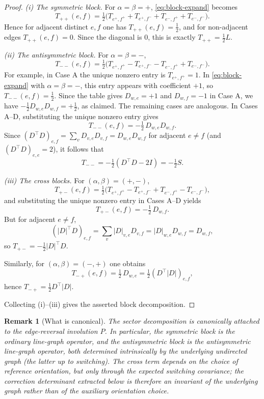 \documentclass[11pt]{article}
\newtheorem{remark}{Remark}
\begin{document}
\begin{proof}
\smallskip
\noindent\emph{(i) The symmetric block.}
For $\alpha=\beta=+$, \eqref{eq:block-expand} becomes
\[
T_{++}(e,f)=\tfrac12\bigl(T_{e^+,f^+}+T_{e^+,f^-}+T_{e^-,f^+}+T_{e^-,f^-}\bigr).
\]
Hence for adjacent distinct $e,f$ one has $T_{++}(e,f)=\tfrac12$, and for non-adjacent
edges $T_{++}(e,f)=0$. Since the diagonal is $0$, this is exactly $T_{++}=\tfrac12 L$.

\smallskip
\noindent\emph{(ii) The antisymmetric block.}
For $\alpha=\beta=-$,
\[
T_{--}(e,f)=\tfrac12\bigl(T_{e^+,f^+}-T_{e^+,f^-}-T_{e^-,f^+}+T_{e^-,f^-}\bigr).
\]
For example, in Case A the unique nonzero entry is $T_{e^+,f^+}=1$.
In \eqref{eq:block-expand} with $\alpha=\beta=-$, this entry appears with coefficient $+1$,
so $T_{--}(e,f)=\tfrac12$. Since the table gives $D_{w,e}=+1$ and $D_{w,f}=-1$ in Case A,
we have $-\tfrac12 D_{w,e}D_{w,f}=+\tfrac12$, as claimed. The remaining cases are analogous.
In Cases A--D, substituting the unique nonzero entry gives
\[
T_{--}(e,f)= -\tfrac12\,D_{w,e}D_{w,f}.
\]
Since $(D^\top D)_{e,f}=\sum_{v}D_{v,e}D_{v,f}=D_{w,e}D_{w,f}$ for adjacent $e\neq f$
(and $(D^\top D)_{e,e}=2$), it follows that
\[
T_{--} = -\tfrac12(D^\top D-2I)= -\tfrac12 S.
\]

\smallskip
\noindent\emph{(iii) The cross blocks.}
For $(\alpha,\beta)=(+,-)$,
\[
T_{+-}(e,f)=\tfrac12\bigl(T_{e^+,f^+}-T_{e^+,f^-}+T_{e^-,f^+}-T_{e^-,f^-}\bigr),
\]
and substituting the unique nonzero entry in Cases A--D yields
\[
T_{+-}(e,f)= -\tfrac12\,D_{w,f}.
\]
But for adjacent $e\neq f$,
\[
(|D|^\top D)_{e,f}=\sum_v |D|_{v,e}D_{v,f} = |D|_{w,e}D_{w,f}=D_{w,f},
\]
so $T_{+-}=-\tfrac12|D|^\top D$.

Similarly, for $(\alpha,\beta)=(-,+)$ one obtains
\[
T_{-+}(e,f)= \tfrac12\,D_{w,e}=\tfrac12(D^\top|D|)_{e,f},
\]
hence $T_{-+}=\tfrac12 D^\top|D|$.

Collecting (i)--(iii) gives the asserted block decomposition.
\end{proof}

\begin{remark}[What is canonical]
The sector decomposition is canonically attached to the edge-reversal involution $P$. In particular, the symmetric block is the ordinary line-graph operator, and the antisymmetric block is the antisymmetric line-graph operator, both determined intrinsically by the underlying undirected graph (the latter up to switching). The cross term depends on the choice of reference orientation, but only through the expected switching covariance; the correction determinant extracted below is therefore an invariant of the underlying graph rather than of the auxiliary orientation choice.
\end{remark}
\end{document}
